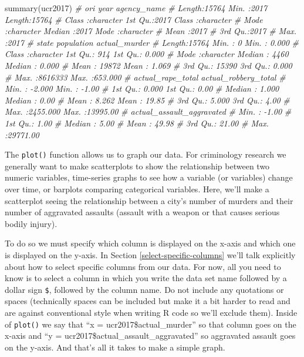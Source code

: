 \documentclass[
]{krantz}
\makeatletter
\newenvironment{Shaded}{\begin{snugshade}}{\end{snugshade}}
\newcommand{\CommentTok}[1]{\textcolor[rgb]{0.37,0.37,0.37}{\textit{#1}}}
\newcommand{\FunctionTok}[1]{\textcolor[rgb]{0,0,0}{#1}}
\newcommand{\NormalTok}[1]{#1}
\newenvironment{kframe}{%
\medskip{}
\setlength{\fboxsep}{.8em}
 \def\at@end@of@kframe{}%
 \ifinner\ifhmode%
  \def\at@end@of@kframe{\end{minipage}}%
  \begin{minipage}{\columnwidth}%
 \fi\fi%
 \def\FrameCommand##1{\hskip\@totalleftmargin \hskip-\fboxsep
 \colorbox{shadecolor}{##1}\hskip-\fboxsep
     \hskip-\linewidth \hskip-\@totalleftmargin \hskip\columnwidth}%
 \MakeFramed {\advance\hsize-\width
   \@totalleftmargin\z@ \linewidth\hsize
   \@setminipage}}%
 {\par\unskip\endMakeFramed%
 \at@end@of@kframe}
\renewenvironment{Shaded}{\begin{kframe}}{\end{kframe}}
\makeatother
\begin{document}
\begin{Shaded}
\begin{Highlighting}[]
\FunctionTok{summary}\NormalTok{(ucr2017)}
\CommentTok{\#      ori                 year      agency\_name       }
\CommentTok{\#  Length:15764       Min.   :2017   Length:15764      }
\CommentTok{\#  Class :character   1st Qu.:2017   Class :character  }
\CommentTok{\#  Mode  :character   Median :2017   Mode  :character  }
\CommentTok{\#                     Mean   :2017                     }
\CommentTok{\#                     3rd Qu.:2017                     }
\CommentTok{\#                     Max.   :2017                     }
\CommentTok{\#     state             population      actual\_murder    }
\CommentTok{\#  Length:15764       Min.   :      0   Min.   :  0.000  }
\CommentTok{\#  Class :character   1st Qu.:    914   1st Qu.:  0.000  }
\CommentTok{\#  Mode  :character   Median :   4460   Median :  0.000  }
\CommentTok{\#                     Mean   :  19872   Mean   :  1.069  }
\CommentTok{\#                     3rd Qu.:  15390   3rd Qu.:  0.000  }
\CommentTok{\#                     Max.   :8616333   Max.   :653.000  }
\CommentTok{\#  actual\_rape\_total  actual\_robbery\_total}
\CommentTok{\#  Min.   :  {-}2.000   Min.   :   {-}1.00    }
\CommentTok{\#  1st Qu.:   0.000   1st Qu.:    0.00    }
\CommentTok{\#  Median :   1.000   Median :    0.00    }
\CommentTok{\#  Mean   :   8.262   Mean   :   19.85    }
\CommentTok{\#  3rd Qu.:   5.000   3rd Qu.:    4.00    }
\CommentTok{\#  Max.   :2455.000   Max.   :13995.00    }
\CommentTok{\#  actual\_assault\_aggravated}
\CommentTok{\#  Min.   :   {-}1.00         }
\CommentTok{\#  1st Qu.:    1.00         }
\CommentTok{\#  Median :    5.00         }
\CommentTok{\#  Mean   :   49.98         }
\CommentTok{\#  3rd Qu.:   21.00         }
\CommentTok{\#  Max.   :29771.00}
\end{Highlighting}
\end{Shaded}

The \texttt{plot()} function allows us to graph our data.
For criminology research we generally want to make
scatterplots to show the relationship between two numeric
variables, time-series graphs to see how a variable (or
variables) change over time, or barplots comparing
categorical variables. Here, we'll make a scatterplot seeing
the relationship between a city's number of murders and
their number of aggravated assaults (assault with a weapon
or that causes serious bodily injury).

To do so we must specify which column is displayed on the
x-axis and which one is displayed on the y-axis. In Section
\ref{select-specific-columns} we'll talk explicitly about
how to select specific columns from our data. For now, all
you need to know is to select a column in which you write
the data set name followed by a dollar sign \texttt{\$},
followed by the column name. Do not include any quotations
or spaces (technically spaces can be included but make it a
bit harder to read and are against conventional style when
writing R code so we'll exclude them). Inside of
\texttt{plot()} we say that ``x = ucr2017\$actual\_murder''
so that column goes on the x-axis and ``y =
ucr2017\$actual\_assault\_aggravated'' so aggravated assault
goes on the y-axis. And that's all it takes to make a simple
graph.
\end{document}
